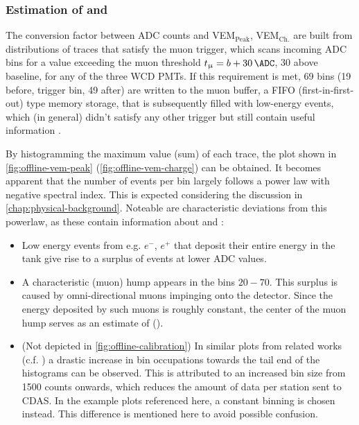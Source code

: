 \subsubsection{Estimation of \Ipeak and \Qpeak}
\label{sssec:offline-vem-calibration}

The conversion factor between ADC counts and VEM$_\text{Peak}$, VEM$_\text{Ch.}$ are built from distributions of traces that satisfy the muon trigger, which scans
incoming ADC bins for a value exceeding the muon threshold $t_\upmu = b + \SI{30}{\ADC}$, \SI{30}{\ADC} above baseline, for any of the three WCD PMTs. If this 
requirement is met, 69 bins (19 before, trigger bin, 49 after) are written to the muon buffer, a FIFO (first-in-first-out) type memory storage, that is
subsequently filled with low-energy events, which (in general) didn't satisfy any other trigger but still contain useful information \cite{localStationCalib}.

By histogramming the maximum value (sum) of each trace, the plot shown in \autoref{fig:offline-vem-peak} (\autoref{fig:offline-vem-charge}) can be obtained. It 
becomes apparent that the number of events per bin largely follows a power law with negative spectral index. This is expected considering the discussion in 
\autoref{chap:physical-background}. Noteable are characteristic deviations from this powerlaw, as these contain information about \Ipeak and \Qpeak:

\begin{itemize}
	\item Low energy events from e.g. $e^-$, $e^+$ that deposit their entire energy in the tank give rise to a surplus of events at lower ADC values.
	\item A characteristic (muon) hump appears in the bins $20 - 70$. This surplus is caused by omni-directional muons impinging onto the detector. Since the 
	energy deposited by such muons is roughly constant, the center of the muon hump serves as an estimate of \Ipeak (\Qpeak).
	\item (Not depicted in \autoref{fig:offline-calibration}) In similar plots from related works (c.f. \cite{localStationCalib, streich2018performance}) a
	drastic increase in bin occupations towards the tail end of the histograms can be observed. This is attributed to an increased bin size from \SI{1500}{\ADC} 
	counts onwards, which reduces the amount of data per station sent to CDAS. In the example plots referenced here, a constant binning is chosen instead. 
	This difference is mentioned here to avoid possible confusion. 
\end{itemize}

